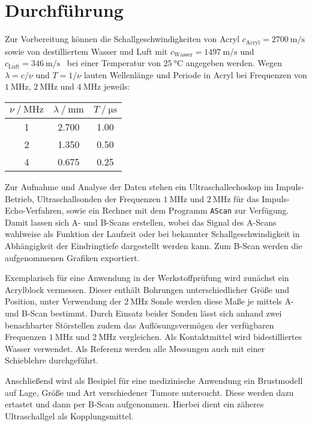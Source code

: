 \section{Durchführung}
\label{sec:durchführung}

Zur Vorbereitung können die Schallgeschwindigkeiten von Acryl $c_\text{Acryl} = \qty{2700}{\meter\per\second}$ \cite{doppler}
sowie von destilliertem Wasser und Luft mit $c_\text{Wasser} = \qty{1497}{\meter\per\second}$ und
$c_\text{Luft} = \qty{346}{\meter\per\second}$~\cite{lid_chem_phy} bei einer Temperatur von $\qty{25}{\celsius}$ angegeben werden.
Wegen $\lambda = c / \nu$ und $T = 1 / \nu$ lauten Wellenlänge und Periode in Acryl bei Frequenzen von $\qty{1}{\mega\hertz}$,
$\qty{2}{\mega\hertz}$ und $\qty{4}{\mega\hertz}$ jeweils:

\begin{table}[H]
	\centering
	\begin{tabular}{S[table-format=1.0] S[table-format=1.3] S[table-format=1.2]}
		\toprule
		{$\nu \mathbin{/} \unit{\mega\hertz}$} &
		{$\lambda \mathbin{/} \unit{\milli\meter}$} &
		{$T \mathbin{/} \unit{\micro\second}$} \\
		 & 2.700 & 1.00 \\
		2 & 1.350 & 0.50 \\
		4 & 0.675 & 0.25 \\
		\bottomrule
	\end{tabular}
\end{table}

Zur Aufnahme und Analyse der Daten stehen ein Ultraschallechoskop im Impuls-Betrieb, Ultraschallsonden der Frequenzen $\qty{1}{\mega\hertz}$
und $\qty{2}{\mega\hertz}$ für das Impuls-Echo-Verfahren, sowie ein Rechner mit dem Programm \verb+AScan+ zur Verfügung. Damit lassen sich
A- und B-Scans erstellen, wobei das Signal des A-Scans wahlweise als Funktion der Laufzeit oder bei bekannter Schallgeschwindigkeit in
Abhängigkeit der Eindringtiefe dargestellt werden kann. Zum B-Scan werden die aufgenommenen Grafiken exportiert.

Exemplarisch für eine Anwendung in der Werkstoffprüfung wird zunächst ein Acrylblock vermessen. Dieser enthält Bohrungen unterschiedlicher
Größe und Position, unter Verwendung der $\qty{2}{\mega\hertz}$ Sonde werden diese Maße je mittels A- und B-Scan bestimmt. Durch Einsatz beider
Sonden lässt sich anhand zwei benachbarter Störstellen zudem das Auflösungsvermögen der verfügbaren Frequenzen $\qty{1}{\mega\hertz}$ und
$\qty{2}{\mega\hertz}$ vergleichen. Als Kontaktmittel wird bidestilliertes Wasser verwendet. Als Referenz werden alle Messungen auch mit
einer Schieblehre durchgeführt.

Anschließend wird als Besipiel für eine medizinische Anwendung ein Brustmodell auf Lage, Größe und Art verschiedener Tumore untersucht. Diese
werden dazu ertastet und dann per B-Scan aufgenommen. Hierbei dient ein zäheres Ultraschallgel als Kopplungsmittel.
\newpage
